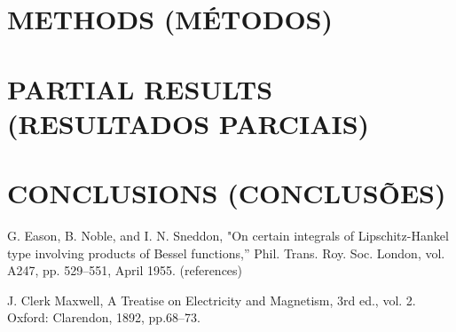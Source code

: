 \documentclass[a4paper,12pt]{article}
\begin{document}

	\section{METHODS (MÉTODOS)} \label{sec:method}
	
	\section{PARTIAL RESULTS (RESULTADOS PARCIAIS)} \label{sec:part_result}
	
	\section{CONCLUSIONS (CONCLUSÕES)}

	\begin{thebibliography}{9}
		
		G. Eason, B. Noble, and I. N. Sneddon,
		\newblock "On certain integrals of Lipschitz-Hankel type involving products of Bessel functions,” Phil. Trans. Roy. Soc. London, vol. A247, pp. 529–551, April 1955. (references)

		J. Clerk Maxwell,
		\newblock A Treatise on Electricity and Magnetism, 3rd ed., vol. 2. Oxford: Clarendon, 1892, pp.68–73.
		
		
	\end{thebibliography}
\end{document}
